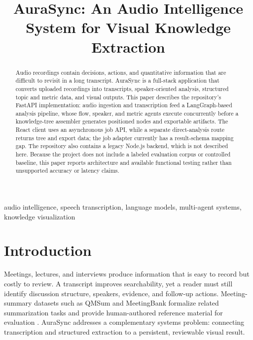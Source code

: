 \documentclass[conference]{IEEEtran}
\begin{document}
\title{AuraSync: An Audio Intelligence System for Visual Knowledge Extraction}

\author{
  \and
  \and
}

\maketitle

\begin{abstract}
Audio recordings contain decisions, actions, and quantitative information that are difficult to revisit in a long transcript. AuraSync is a full-stack application that converts uploaded recordings into transcripts, speaker-oriented analysis, structured topic and metric data, and visual outputs. This paper describes the repository's FastAPI implementation: audio ingestion and transcription feed a LangGraph-based analysis pipeline, whose flow, speaker, and metric agents execute concurrently before a knowledge-tree assembler generates positioned nodes and exportable artifacts. The React client uses an asynchronous job API, while a separate direct-analysis route returns tree and export data; the job adapter currently has a result-schema mapping gap. The repository also contains a legacy Node.js backend, which is not described here. Because the project does not include a labeled evaluation corpus or controlled baseline, this paper reports architecture and available functional testing rather than unsupported accuracy or latency claims.
\end{abstract}

\begin{IEEEkeywords}
audio intelligence, speech transcription, language models, multi-agent systems, knowledge visualization
\end{IEEEkeywords}

\section{Introduction}
Meetings, lectures, and interviews produce information that is easy to record but costly to review. A transcript improves searchability, yet a reader must still identify discussion structure, speakers, evidence, and follow-up actions. Meeting-summary datasets such as QMSum and MeetingBank formalize related summarization tasks and provide human-authored reference material for evaluation \cite{qmsum,meetingbank}. AuraSync addresses a complementary systems problem: connecting transcription and structured extraction to a persistent, reviewable visual result.
\end{document}
